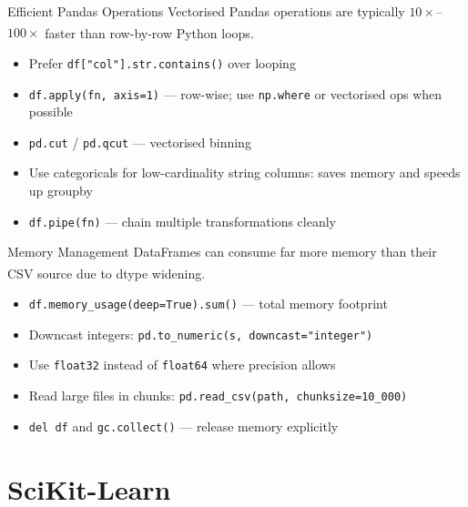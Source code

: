\begin{v3topic}{Efficient Pandas Operations}
    Vectorised Pandas operations are typically $10\times$--$100\times$ faster than row-by-row Python loops\textsuperscript{\cite{molinHandsonDataAnalysis2021}}.
\visualseparator
    \begin{itemize}
        \item Prefer \texttt{df["col"].str.contains()} over looping
        \item \texttt{df.apply(fn, axis=1)} --- row-wise; use \texttt{np.where} or vectorised ops when possible
        \item \texttt{pd.cut} / \texttt{pd.qcut} --- vectorised binning
        \item Use categoricals for low-cardinality string columns: saves memory and speeds up groupby
        \item \texttt{df.pipe(fn)} --- chain multiple transformations cleanly
    \end{itemize}

\end{v3topic}
\begin{v3topic}{Memory Management}
    DataFrames can consume far more memory than their CSV source due to dtype widening\textsuperscript{\cite{molinHandsonDataAnalysis2021}}.
\visualseparator
    \begin{itemize}
        \item \texttt{df.memory\_usage(deep=True).sum()} --- total memory footprint
        \item Downcast integers: \texttt{pd.to\_numeric(s, downcast="integer")}
        \item Use \texttt{float32} instead of \texttt{float64} where precision allows
        \item Read large files in chunks: \texttt{pd.read\_csv(path, chunksize=10\_000)}
        \item \texttt{del df} and \texttt{gc.collect()} --- release memory explicitly
    \end{itemize}
\end{v3topic}

\section{SciKit-Learn}

